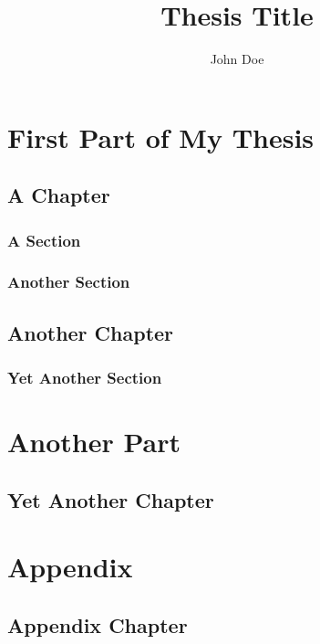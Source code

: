\documentclass[
  twoside,
  11pt, a4paper,
  footinclude=true,
  headinclude=true,
  cleardoublepage=empty
]{scrbook}
\title{Thesis Title}
\author{John Doe}
\begin{document}
\maketitle







\part{First Part of My Thesis}

\chapter{A Chapter}
\lipsum[1] %

\section{A Section}
\lipsum[1] %

\section{Another Section}
\lipsum[1] %

\chapter{Another Chapter}
\lipsum[1] %

\section{Yet Another Section}
\lipsum[1] %

\part{Another Part}

\chapter{Yet Another Chapter}
\lipsum[1] %
  
\appendix
\part{Appendix}
\chapter{Appendix Chapter}
\lipsum[1]
    
\end{document}
